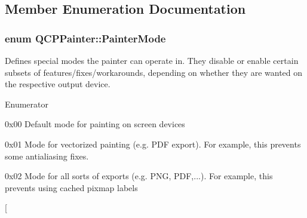 \subsection{Member Enumeration Documentation}
\hypertarget{class_q_c_p_painter_a156cf16444ff5e0d81a73c615fdb156d}{
\subsubsection[{Painter\-Mode}]{\setlength{\rightskip}{0pt plus 5cm}enum {\bf Q\-C\-P\-Painter\-::\-Painter\-Mode}}}\label{class_q_c_p_painter_a156cf16444ff5e0d81a73c615fdb156d}
Defines special modes the painter can operate in. They disable or enable certain subsets of features/fixes/workarounds, depending on whether they are wanted on the respective output device. \begin{Desc}
\item[Enumerator]\par
\begin{description}
\item[{\em 
\hypertarget{class_q_c_p_painter_a156cf16444ff5e0d81a73c615fdb156da3bac5e87e3d58553b297befb4eee2a45}{pm\-Default}\label{class_q_c_p_painter_a156cf16444ff5e0d81a73c615fdb156da3bac5e87e3d58553b297befb4eee2a45}
}]{\ttfamily 0x00} Default mode for painting on screen devices \item[{\em 
\hypertarget{class_q_c_p_painter_a156cf16444ff5e0d81a73c615fdb156daeda679cd55dcd468341d07d48a30b6ab}{pm\-Vectorized}\label{class_q_c_p_painter_a156cf16444ff5e0d81a73c615fdb156daeda679cd55dcd468341d07d48a30b6ab}
}]{\ttfamily 0x01} Mode for vectorized painting (e.\-g. P\-D\-F export). For example, this prevents some antialiasing fixes. \item[{\em 
\hypertarget{class_q_c_p_painter_a156cf16444ff5e0d81a73c615fdb156dae78f9a4eb277a5f9207f50850a51a0b0}{pm\-No\-Caching}\label{class_q_c_p_painter_a156cf16444ff5e0d81a73c615fdb156dae78f9a4eb277a5f9207f50850a51a0b0}
}]{\ttfamily 0x02} Mode for all sorts of exports (e.\-g. P\-N\-G, P\-D\-F,...). For example, this prevents using cached pixmap labels \item[{\em 
}
\end{description}
\end{Desc}
